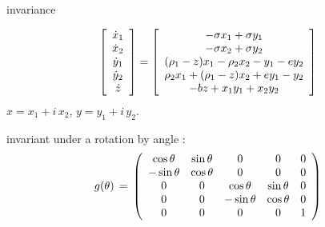 \begin{frame}{ invariance}
			\begin{exampleblock}{{\cLe}}
\scriptsize		
\[
		\left[
					\begin{array}{c}
				\dot{x}_1 \\ \dot{x}_2 \\ \dot{y}_1 \\ \dot{y}_2 \\ \dot{z}
				\end{array}
		\right]
=
		\left[
					\begin{array}{c}
				 -\sigma x_1 + \sigma y_1 \\
				-\sigma x_2 + \sigma y_2 \\
                (\RerCLor-z) x_1 - \ImrCLor x_2 -y_1-e y_2 \\
                \ImrCLor x_1 + (\RerCLor-z) x_2 + e y_1- y_2 \\
				-b z + x_1 y_1 + x_2 y_2
				\end{array}
		\right]
\]
$x=x_1+i\,x_2$, $y=y_1+i\,y_2$.
			\end{exampleblock}

\begin{block}{}
invariant under a  rotation by angle
\gSpace:
\scriptsize		
\[
\LieEl(\gSpace) \,=\,  \left(\barr{ccccc}
  \cos \gSpace  & \sin \gSpace  & 0 & 0 & 0 \\
 -\sin \gSpace  & \cos \gSpace  & 0 & 0 & 0 \\
 0 & 0 &  \cos \gSpace & \sin \gSpace   & 0 \\
 0 & 0 & -\sin \gSpace & \cos \gSpace   & 0 \\
 0 & 0 & 0             & 0              & 1
    \earr\right)
\] %
\end{block}
\end{frame}


